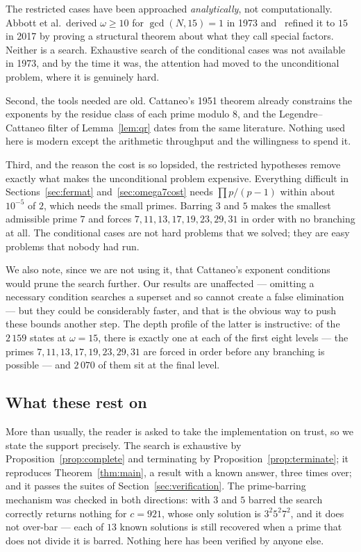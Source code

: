 \documentclass[11pt]{amsart}
\theoremstyle{remark}
\begin{document}
The restricted cases have been approached \emph{analytically}, not
computationally. Abbott et al.\ derived $\omega \ge 10$ for $\gcd(N,15) = 1$ in
1973 and~\cite{prasad} refined it to $15$ in 2017 by proving a structural theorem
about what they call special factors. Neither is a search. Exhaustive search of
the conditional cases was not available in 1973, and by the time it was, the
attention had moved to the unconditional problem, where it is genuinely hard.

Second, the tools needed are old. Cattaneo's 1951 theorem already constrains the
exponents by the residue class of each prime modulo $8$, and the
Legendre--Cattaneo filter of Lemma~\ref{lem:qr} dates from the same literature.
Nothing used here is modern except the arithmetic throughput and the willingness
to spend it.

Third, and the reason the cost is so lopsided, the restricted hypotheses remove
exactly what makes the unconditional problem expensive. Everything difficult in
Sections~\ref{sec:fermat} and~\ref{sec:omega7cost} needs $\prod p/(p-1)$ within
about $10^{-5}$ of $2$, which needs the small primes. Barring $3$ and $5$ makes
the smallest admissible prime $7$ and forces $7, 11, 13, 17, 19, 23, 29, 31$ in
order with no branching at all. The conditional cases are not hard problems that
we solved; they are easy problems that nobody had run.

We also note, since we are not using it, that Cattaneo's exponent conditions
would prune the search further. Our results are unaffected --- omitting a
necessary condition searches a superset and so cannot create a false
elimination --- but they could be considerably faster, and that is the obvious
way to push these bounds another step. The depth profile of the latter is
instructive: of the $2\,159$ states at $\omega = 15$, there is exactly one at each
of the first eight levels --- the primes $7, 11, 13, 17, 19, 23, 29, 31$ are
forced in order before any branching is possible --- and $2\,070$ of them sit at
the final level.

\subsection{What these rest on}\label{sec:conditional-caveats}
More than usually, the reader is asked to take the implementation on trust, so we
state the support precisely. The search is exhaustive by
Proposition~\ref{prop:complete} and terminating by
Proposition~\ref{prop:terminate}; it reproduces Theorem~\ref{thm:main}, a result
with a known answer, three times over; and it passes the suites of
Section~\ref{sec:verification}. The prime-barring mechanism was checked in both
directions: with $3$ and $5$ barred the search correctly returns nothing for
$c = 921$, whose only solution is $3^{2}5^{2}7^{2}$, and it does not over-bar ---
each of $13$ known solutions is still recovered when a prime that does not divide
it is barred. Nothing here has been verified by anyone else.
\end{document}
